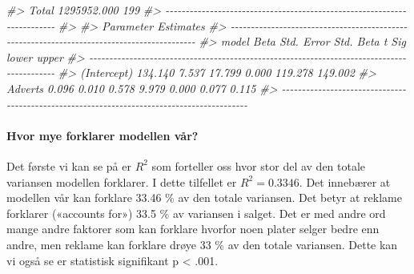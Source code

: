 \documentclass[
]{article}
\newenvironment{Shaded}{\begin{snugshade}}{\end{snugshade}}
\newcommand{\CommentTok}[1]{\textcolor[rgb]{0.56,0.35,0.01}{\textit{#1}}}
\begin{document}
\begin{Shaded}
\begin{Highlighting}[]
\CommentTok{\#\textgreater{} Total         1295952.000        199                                    }
\CommentTok{\#\textgreater{} {-}{-}{-}{-}{-}{-}{-}{-}{-}{-}{-}{-}{-}{-}{-}{-}{-}{-}{-}{-}{-}{-}{-}{-}{-}{-}{-}{-}{-}{-}{-}{-}{-}{-}{-}{-}{-}{-}{-}{-}{-}{-}{-}{-}{-}{-}{-}{-}{-}{-}{-}{-}{-}{-}{-}{-}{-}{-}{-}{-}{-}{-}{-}{-}{-}{-}{-}{-}{-}{-}{-}{-}}
\CommentTok{\#\textgreater{} }
\CommentTok{\#\textgreater{}                                     Parameter Estimates                                     }
\CommentTok{\#\textgreater{} {-}{-}{-}{-}{-}{-}{-}{-}{-}{-}{-}{-}{-}{-}{-}{-}{-}{-}{-}{-}{-}{-}{-}{-}{-}{-}{-}{-}{-}{-}{-}{-}{-}{-}{-}{-}{-}{-}{-}{-}{-}{-}{-}{-}{-}{-}{-}{-}{-}{-}{-}{-}{-}{-}{-}{-}{-}{-}{-}{-}{-}{-}{-}{-}{-}{-}{-}{-}{-}{-}{-}{-}{-}{-}{-}{-}{-}{-}{-}{-}{-}{-}{-}{-}{-}{-}{-}{-}{-}{-}{-}}
\CommentTok{\#\textgreater{}       model       Beta    Std. Error    Std. Beta      t        Sig       lower      upper }
\CommentTok{\#\textgreater{} {-}{-}{-}{-}{-}{-}{-}{-}{-}{-}{-}{-}{-}{-}{-}{-}{-}{-}{-}{-}{-}{-}{-}{-}{-}{-}{-}{-}{-}{-}{-}{-}{-}{-}{-}{-}{-}{-}{-}{-}{-}{-}{-}{-}{-}{-}{-}{-}{-}{-}{-}{-}{-}{-}{-}{-}{-}{-}{-}{-}{-}{-}{-}{-}{-}{-}{-}{-}{-}{-}{-}{-}{-}{-}{-}{-}{-}{-}{-}{-}{-}{-}{-}{-}{-}{-}{-}{-}{-}{-}{-}}
\CommentTok{\#\textgreater{} (Intercept)    134.140         7.537                 17.799    0.000    119.278    149.002 }
\CommentTok{\#\textgreater{}     Adverts      0.096         0.010        0.578     9.979    0.000      0.077      0.115 }
\CommentTok{\#\textgreater{} {-}{-}{-}{-}{-}{-}{-}{-}{-}{-}{-}{-}{-}{-}{-}{-}{-}{-}{-}{-}{-}{-}{-}{-}{-}{-}{-}{-}{-}{-}{-}{-}{-}{-}{-}{-}{-}{-}{-}{-}{-}{-}{-}{-}{-}{-}{-}{-}{-}{-}{-}{-}{-}{-}{-}{-}{-}{-}{-}{-}{-}{-}{-}{-}{-}{-}{-}{-}{-}{-}{-}{-}{-}{-}{-}{-}{-}{-}{-}{-}{-}{-}{-}{-}{-}{-}{-}{-}{-}{-}{-}}
\end{Highlighting}
\end{Shaded}

\hypertarget{hvor-mye-forklarer-modellen-vuxe5r}{%
\paragraph{Hvor mye forklarer modellen vår?}\label{hvor-mye-forklarer-modellen-vuxe5r}}

Det første vi kan se på er \(R^{2}\) som forteller oss hvor stor del av den totale variansen modellen forklarer. I dette tilfellet er \(R^{2} = 0.3346\). Det innebærer at modellen vår kan forklare 33.46 \% av den totale variansen. Det betyr at reklame forklarer («accounts for») 33.5 \% av variansen i salget. Det er med andre ord mange andre faktorer som kan forklare hvorfor noen plater selger bedre enn andre, men reklame kan forklare drøye 33 \% av den totale variansen. Dette kan vi også se er statistisk signifikant p \textless{} .001.
\end{document}
